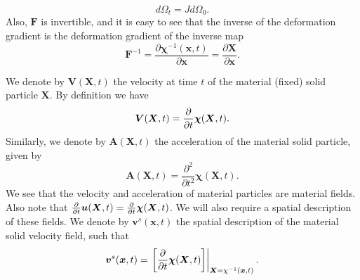 \begin{equation}
d\Omega_{t}=Jd\Omega_{0}.
\label{j_volume}
\end{equation}
Also, $\boldsymbol{F}$ is invertible, and it is easy to see that the inverse of the deformation gradient is the deformation gradient of the inverse map
\begin{equation}
\boldsymbol{F}^{-1}=\frac{\partial \boldsymbol{\chi}^{-1}(\boldsymbol{x},t)}{\partial \boldsymbol{x} }=\frac{\partial \boldsymbol{X}}{\partial \boldsymbol{x} }.
\end{equation}
\begin{comment}
$\boldsymbol{F}$ can also be used to map between surfaces in the two configurations. Consider a surface element $dA$, oriented by the unit normal vector $\boldsymbol{N}$ in the undeformed configuration, and ${d}a$, a surface element in the deformed configuration, oriented by the unit normal vector $\boldsymbol{n}$, then
\begin{equation}
 \boldsymbol{n}  {d}a=J \boldsymbol{F}^{-T}  \boldsymbol{N} dA.
\label{eqn:push_backward}.
\end{equation}
For a detailed derivation see section 4.6.3 in \cite{gonzalez2008first} (Might not actually need this for this document).
\end{comment}
We denote by $\boldsymbol{V}(\boldsymbol{X},t)$ the velocity at time $t$ of the material (fixed) solid particle $\boldsymbol{X}$. By definition we have
\begin{equation}
 \boldsymbol{V}(\boldsymbol{X},t)= \frac{\partial }{\partial t}\boldsymbol\chi(\boldsymbol{X},t).
\end{equation}
Similarly, we denote by $\boldsymbol{A}(\boldsymbol{X},t)$ the acceleration of the material solid particle, given by
\begin{equation}
 \boldsymbol{A}(\boldsymbol{X},t)= \frac{\partial^{2}}{\partial t^{2}}\boldsymbol\chi(\boldsymbol{X},t).
\end{equation}
We see that the velocity and acceleration of material particles are material fields. Also note that $\frac{\partial }{\partial t}\boldsymbol{u}(\boldsymbol{X},t)=\frac{\partial }{\partial t}\boldsymbol\chi(\boldsymbol{X},t)$. We will also require a spatial description of these fields. We denote by $\boldsymbol{v}^{s}(\boldsymbol{x},t)$ the spatial description of the material solid velocity field, such that
\begin{equation}
\label{eqn:vs_spatial}
 \boldsymbol{v}^{s}(\boldsymbol{x},t)= \left. \left[ \frac{\partial }{\partial t}\boldsymbol\chi(\boldsymbol{X},t) \right] \right|_{\boldsymbol{X}={\chi}^{-1}(\boldsymbol{x},t)}.
\end{equation}
